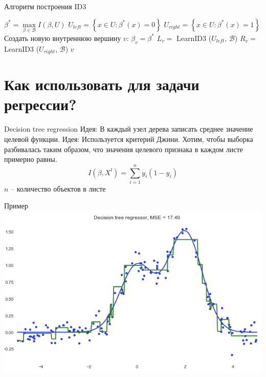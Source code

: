 \documentclass[10pt]{beamer}
\begin{document}
{
\begin{frame}{Алгоритм построения ID3}
  \begin{algorithmic}[1]
         \State {}
       \EndIf
       \State $\beta^* = \max\limits_{\beta \in \mathscr{B}} I(\beta, U)$
       \State $U_{left} = \left\{ x \in U : \beta^*(x) = 0\right\}$	
       \State $U_{right} = \left\{ x \in U : \beta^*(x) = 1\right\}$	
         \State {}
       \EndIf
       \State Создать новую внутреннюю вершину $v$: $\beta_v = \beta^*$
       \State $L_v =$ LearnID3 ($U_{left}$, $\mathscr{B}$)
       \State $R_v =$ LearnID3 ($U_{right}$, $\mathscr{B}$)
       \State \Return $v$
    \EndFunction
  \end{algorithmic}    
\end{frame}
}

\section{Как использовать для задачи регрессии?}

\begin{frame}{Decision tree regression}
  \alert{Идея}: В каждый узел дерева записать среднее значение целевой функции. 
  \pause
  \bigbreak
  \alert{Идея}: Используется критерий Джини. Хотим, чтобы выборка разбивалась таким образом, что значения целевого признака в каждом листе примерно равны.
  \pause
  \bigbreak
  $$I(\beta,X^l)= \sum\limits_{i=1}^n y_i(1 - y_i)$$
  $n$ -- количество объектов в листе
\end{frame}

\begin{frame}{Пример}
  \centering
  \includegraphics[width=0.9 \textwidth, keepaspectratio]{images/decision_tree}
\end{frame}
\end{document}
